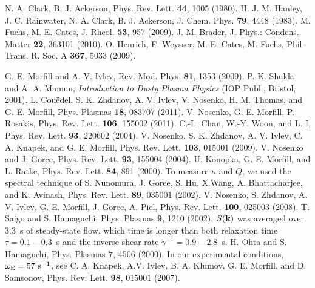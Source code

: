 \documentclass[aps,prl,twocolumn,showpacs,groupedaddress,amssymb]{revtex4}
\begin{document}
\begin{thebibliography}{}

 N. A. Clark, B. J. Ackerson, Phys. Rev. Lett. {\bf 44}, 1005 (1980).
 H. J. M. Hanley, J. C. Rainwater, N. A. Clark, B. J. Ackerson, J. Chem. Phys. {\bf 79}, 4448 (1983).
 M. Fuchs, M. E. Cates, J. Rheol. {\bf 53}, 957 (2009).
 J. M. Brader, J. Phys.: Condens. Matter {\bf 22}, 363101 (2010).
 O. Henrich, F. Weysser, M. E. Cates, M. Fuchs, Phil. Trans. R. Soc. A {\bf 367}, 5033 (2009).

 G. E. Morfill and A. V. Ivlev, Rev. Mod. Phys. {\bf 81}, 1353 (2009).
 P. K. Shukla and A. A. Mamun, {\it Introduction to Dusty Plasma Physics} (IOP Publ., Bristol, 2001).
 L. Cou\"edel, S. K. Zhdanov, A. V. Ivlev, V. Nosenko, H. M. Thomas, and G. E. Morfill, Phys. Plasmas {\bf 18}, 083707 (2011).
 V. Nosenko, G. E. Morfill, P. Rosakis, Phys. Rev. Lett. {\bf 106}, 155002 (2011).
 C.-L. Chan, W.-Y. Woon, and L. I, Phys. Rev. Lett. {\bf 93}, 220602 (2004).
 V. Nosenko, S. K. Zhdanov, A. V. Ivlev, C. A. Knapek, and G. E. Morfill, Phys. Rev. Lett. {\bf 103}, 015001 (2009).
 V. Nosenko and J. Goree, Phys. Rev. Lett. {\bf 93}, 155004 (2004).
 U. Konopka, G. E. Morfill, and L. Ratke, Phys. Rev. Lett. {\bf 84}, 891 (2000).
 To measure $\kappa$ and $Q$, we used the spectral technique of S. Nunomura, J. Goree, S. Hu, X.Wang,
A. Bhattacharjee, and K. Avinash, Phys. Rev. Lett. {\bf 89}, 035001 (2002).
 V. Nosenko, S. Zhdanov, A. V. Ivlev, G. E. Morfill, J. Goree, A. Piel, Phys. Rev. Lett. {\bf 100}, 025003 (2008).
 T. Saigo and S. Hamaguchi, Phys. Plasmas {\bf 9}, 1210 (2002).
 $S(\bf{k})$ was averaged over $3.3$~s of steady-state flow, which time is longer than both relaxation time $\tau=0.1-0.3$~s and the inverse shear rate $\dot{\gamma}^{-1}=0.9-2.8$~s.
 H. Ohta and S. Hamaguchi, Phys. Plasmas {\bf 7}, 4506 (2000).
 In our experimental conditions, $\omega_{\rm E}=57~{\rm s}^{-1}$, see C. A. Knapek, A.V. Ivlev, B. A. Klumov, G. E. Morfill, and D. Samsonov, Phys. Rev. Lett. {\bf 98}, 015001 (2007).

\end{thebibliography}
\end{document}
